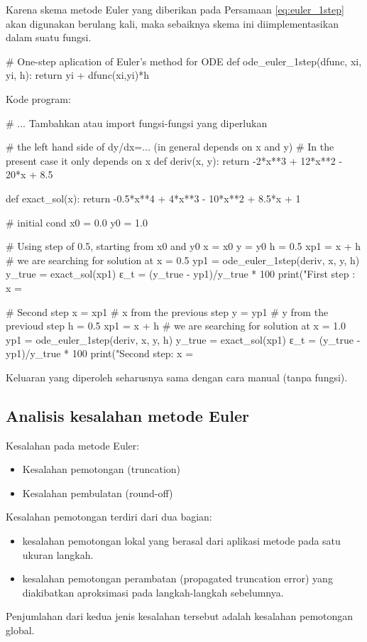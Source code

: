 Karena skema metode Euler yang diberikan pada Persamaan \eqref{eq:euler_1step}
akan digunakan berulang kali, maka sebaiknya skema ini diimplementasikan dalam
suatu fungsi.
\begin{pythoncode}
# One-step aplication of Euler's method for ODE
def ode_euler_1step(dfunc, xi, yi, h):
    return yi + dfunc(xi,yi)*h
\end{pythoncode}

Kode program:
\begin{pythoncode}
# ... Tambahkan atau import fungsi-fungsi yang diperlukan

# the left hand side of dy/dx=... (in general depends on x and y)
# In the present case it only depends on x
def deriv(x, y):
    return -2*x**3 + 12*x**2 - 20*x + 8.5

def exact_sol(x):
    return -0.5*x**4 + 4*x**3 - 10*x**2 + 8.5*x + 1

# initial cond
x0 = 0.0
y0 = 1.0

# Using step of 0.5, starting from x0 and y0
x = x0
y = y0
h = 0.5
xp1 = x + h # we are searching for solution at x = 0.5
yp1 = ode_euler_1step(deriv, x, y, h)
y_true = exact_sol(xp1)
ε_t = (y_true - yp1)/y_true * 100
print("First step : x = %

# Second step
x = xp1 # x from the previous step
y = yp1 # y from the previoud step
h = 0.5
xp1 = x + h # we are searching for solution at x = 1.0
yp1 = ode_euler_1step(deriv, x, y, h)
y_true = exact_sol(xp1)
ε_t = (y_true - yp1)/y_true * 100
print("Second step: x = %
\end{pythoncode}
Keluaran yang diperoleh seharusnya sama dengan cara manual (tanpa fungsi).


\subsection*{Analisis kesalahan metode Euler}

Kesalahan pada metode Euler:
\begin{itemize}
\item Kesalahan pemotongan (truncation)
\item Kesalahan pembulatan (round-off)
\end{itemize}

Kesalahan pemotongan terdiri dari dua bagian:
\begin{itemize}
\item kesalahan pemotongan lokal yang berasal dari aplikasi metode pada satu
ukuran langkah.
\item kesalahan pemotongan perambatan (propagated truncation error) yang diakibatkan
aproksimasi pada langkah-langkah sebelumnya.
\end{itemize}
Penjumlahan dari kedua jenis kesalahan tersebut adalah kesalahan pemotongan global.

